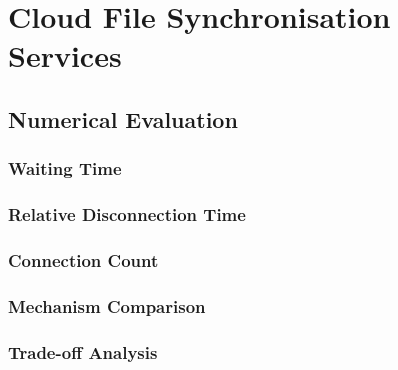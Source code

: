\section{Cloud File Synchronisation Services}\label{sec:application:cloud_file_synchronisation}
\cite{Schwartz2014a}

\newcommand{\dropbox}{\emph{DropBox}\xspace}
\newcommand{\imageFileSize}{\ensuremath{S_I}\xspace}
\newcommand{\imageArrivalRate}{\ensuremath{\lambda_I}\xspace}
\newcommand{\panTransferRate}{\ensuremath{B_{P}}\xspace}
\newcommand{\interarrivaltime}{\ensuremath{t_I}\xspace}
\newcommand{\clientpreparationtime}{\ensuremath{C}\xspace}
\newcommand{\uploadbandwidth}{\ensuremath{B_U}\xspace}
\newcommand{\idleThreshold}{\ensuremath{\tau}\xspace}
\newcommand{\serverpreparationtime}{\ensuremath{S}\xspace}
\newcommand{\downloadbandwidth}{\ensuremath{B_D}\xspace}
\newcommand{\startupDelay}{\ensuremath{\sigma}\xspace}
\newcommand{\sojournTime}{\ensuremath{\Sigma}\xspace}
\newcommand{\relativeDisconnectedTime}{\ensuremath{\Delta}\xspace}
\newcommand{\connectionCount}{\ensuremath{K}\xspace}
\newcommand{\algointerval}{\emph{Interval}\xspace}
\newcommand{\algosize}{\emph{Size}\xspace}
\newcommand{\algoimmediate}{\emph{Immediate}\xspace}





\subsection{Numerical Evaluation}\label{sec:application:cloud_file_synchronisation:numerical_evaluation}
\subsubsection*{Waiting Time}\label{sec:application:cloud_file_synchronisation:numerical_evaluation:waiting_time}
\subsubsection*{Relative Disconnection Time}\label{sec:application:cloud_file_synchronisation:numerical_evaluation:relative_disconnection_time}
\subsubsection*{Connection Count}\label{sec:application:cloud_file_synchronisation:numerical_evaluation:connection_count}
\subsubsection*{Mechanism Comparison}\label{sec:application:cloud_file_synchronisation:numerical_evaluation:mechanism_comparison}
\subsubsection*{Trade-off Analysis}\label{sec:application:cloud_file_synchronisation:numerical_evaluation:trade_off_analysis}